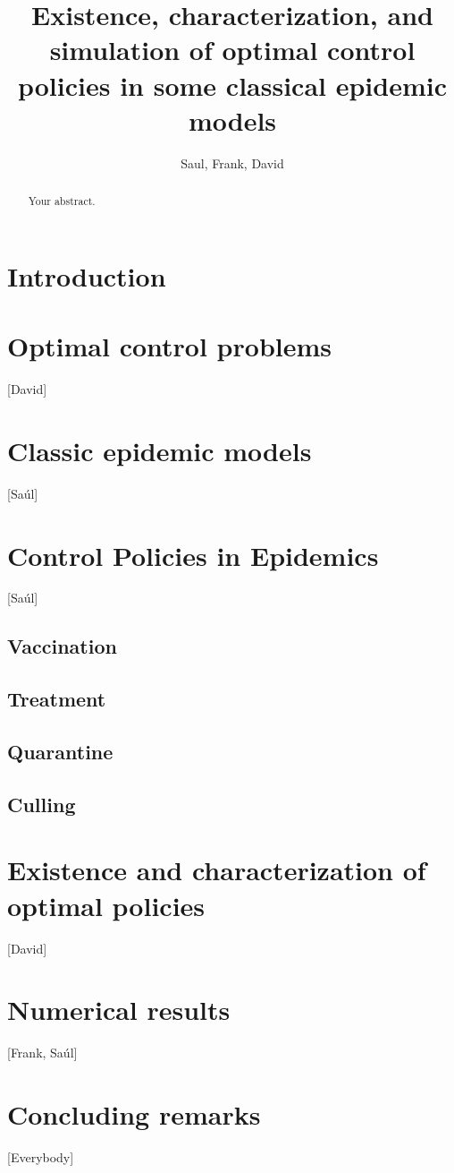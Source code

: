 \documentclass[a4paper]{article}
\title{
	Existence, characterization, and simulation
	of optimal control policies in some classical epidemic models
}
\author{Saul, Frank, David}
\begin{document}
\maketitle

\begin{abstract}
	Your abstract.
\end{abstract}

\section{Introduction}

\section{Optimal control problems}
[David]
	


\section{Classic epidemic models}
[Saúl]



\section{Control Policies in Epidemics}
	[Saúl]
    	
    \subsection{Vaccination}
    	
    \subsection{Treatment}
    	
    \subsection{Quarantine}
    	
    \subsection{Culling}
    	


\section{Existence and characterization of optimal policies}
[David]

\section{Numerical results}
[Frank, Saúl]

\section{Concluding remarks}
[Everybody]



\end{document}
